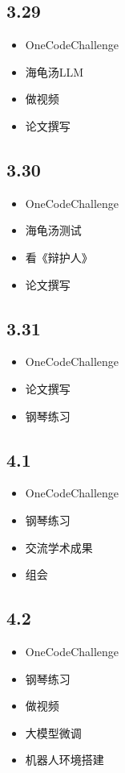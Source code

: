 \documentclass[UTF8]{ctexart}
\begin{document}
\subsection*{3.29}
\begin{itemize}
    \item OneCodeChallenge
    \item 海龟汤LLM
    \item 做视频
    \item 论文撰写
\end{itemize}

\subsection*{3.30}
\begin{itemize}
    \item OneCodeChallenge
    \item 海龟汤测试
    \item 看《辩护人》
    \item 论文撰写
\end{itemize}

\subsection*{3.31}
\begin{itemize}
    \item OneCodeChallenge
    \item 论文撰写
    \item 钢琴练习
\end{itemize}

\subsection*{4.1}
\begin{itemize}
    \item OneCodeChallenge
    \item 钢琴练习
    \item 交流学术成果
    \item 组会
\end{itemize}

\subsection*{4.2}
\begin{itemize}
    \item OneCodeChallenge
    \item 钢琴练习
    \item 做视频
    \item 大模型微调
    \item 机器人环境搭建
\end{itemize}
\end{document}

